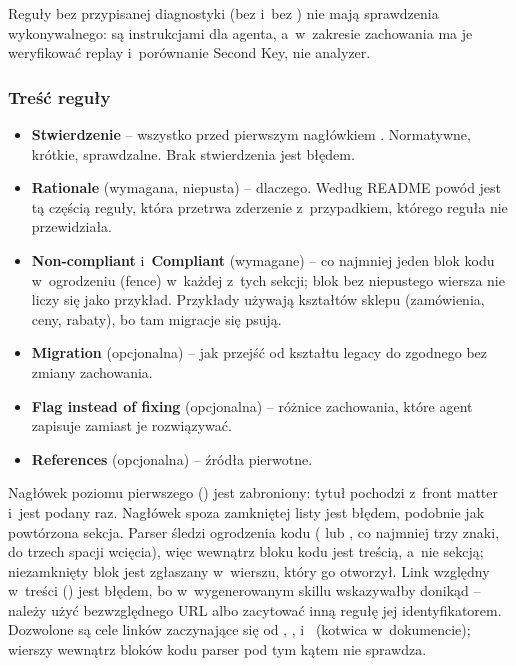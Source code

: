 Reguły bez przypisanej diagnostyki (bez  i~bez
) nie mają sprawdzenia wykonywalnego: są instrukcjami dla agenta,
a~w~zakresie zachowania ma je weryfikować replay i~porównanie Second Key, nie analyzer.

\subsubsection{Treść reguły}

\begin{itemize}
  \item \textbf{Stwierdzenie} -- wszystko przed pierwszym nagłówkiem \repopath{\#\#}. Normatywne,
        krótkie, sprawdzalne. Brak stwierdzenia jest błędem.
  \item \textbf{Rationale} (wymagana, niepusta) -- dlaczego. Według README powód jest tą
        częścią reguły, która przetrwa zderzenie z~przypadkiem, którego reguła nie przewidziała.
  \item \textbf{Non-compliant} i~\textbf{Compliant} (wymagane) -- co najmniej jeden blok kodu
        w~ogrodzeniu (fence) w~każdej z~tych sekcji; blok bez niepustego wiersza nie liczy się
        jako przykład. Przykłady używają kształtów sklepu (zamówienia, ceny, rabaty), bo tam
        migracje się psują.
  \item \textbf{Migration} (opcjonalna) -- jak przejść od kształtu legacy do zgodnego bez
        zmiany zachowania.
  \item \textbf{Flag instead of fixing} (opcjonalna) -- różnice zachowania, które agent
        zapisuje zamiast je rozwiązywać.
  \item \textbf{References} (opcjonalna) -- źródła pierwotne.
\end{itemize}

Nagłówek poziomu pierwszego (\repopath{\#}) jest zabroniony: tytuł pochodzi z~front matter
i~jest podany raz. Nagłówek \repopath{\#\#} spoza zamkniętej listy jest błędem, podobnie jak
powtórzona sekcja. Parser śledzi ogrodzenia kodu ( lub \repopath{\textasciitilde\textasciitilde\textasciitilde}, co najmniej trzy znaki, do trzech
spacji wcięcia), więc  wewnątrz bloku kodu jest treścią, a~nie sekcją;
niezamknięty blok jest zgłaszany w~wierszu, który go otworzył. Link względny w~treści
(\repopath{](plik.md)}) jest błędem, bo w~wygenerowanym skillu wskazywałby donikąd -- należy
użyć bezwzględnego URL albo zacytować inną regułę jej identyfikatorem. Dozwolone są cele
linków zaczynające się od , , 
i~\repopath{\#} (kotwica w~dokumencie); wierszy wewnątrz bloków kodu parser pod tym kątem
nie sprawdza.

